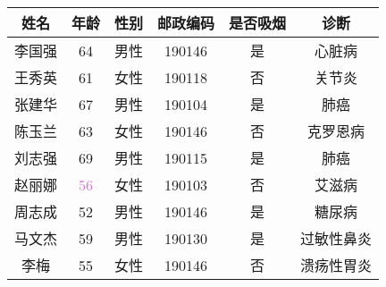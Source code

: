 \begin{tabular}{cccccc}
    \toprule
    \textbf{姓名} & \textbf{年龄} & \textbf{性别} & \textbf{邮政编码} & \textbf{是否吸烟} & \textbf{诊断} \\ \midrule
    李国强 & 64 & 男性 & 190146 & 是 & 心脏病 \\ 
    王秀英 & 61 & 女性 & 190118 & 否 & 关节炎 \\ 
    张建华 & 67 & 男性 & 190104 & 是 & 肺癌 \\ 
    陈玉兰 & 63 & 女性 & 190146 & 否 & 克罗恩病 \\ 
    刘志强 & 69 & 男性 & 190115 & 是 & 肺癌 \\ 
    赵丽娜 & \textcolor{Orchid}{56} & 女性 & 190103 & 否 & 艾滋病 \\ 
    周志成 & 52 & 男性 & 190146 & 是 & 糖尿病 \\ 
    马文杰 & 59 & 男性 & 190130 & 是 & 过敏性鼻炎 \\ 
    李梅 & 55 & 女性 & 190146 & 否 & 溃疡性胃炎 \\ \bottomrule
    \end{tabular}

